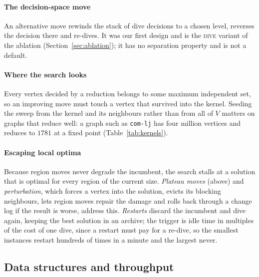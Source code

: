 \documentclass[review,authoryear,11pt]{elsarticle}
\theoremstyle{definition}
\begin{document}
\paragraph{The decision-space move} An alternative move rewinds the stack of dive
decisions to a chosen level, reverses the decision there and re-dives. It was our
first design and is the \textsc{dive} variant of the ablation
(Section~\ref{sec:ablation}); it has no separation property and is not a default.

\paragraph{Where the search looks} Every vertex decided by a reduction belongs
to some maximum independent set, so an improving move must touch a vertex that
survived into the kernel. Seeding the sweep from the kernel and its neighbours
rather than from all of $V$ matters on graphs that reduce well: a graph such as
\texttt{com-lj} has four million vertices and reduces to $1781$ at a fixed point
(Table~\ref{tab:kernels}).

\paragraph{Escaping local optima} Because region moves never degrade the incumbent,
the search stalls at a solution that is optimal for every region of the current
size. \emph{Plateau moves} (above) and \emph{perturbation}, which forces a vertex into
the solution, evicts its blocking neighbours, lets region moves repair the damage and
rolls back through a change log if the result is worse, address this. \emph{Restarts}
discard the incumbent and dive again, keeping the best solution in an archive; the
trigger is idle time in multiples of the cost of one dive, since a restart must pay for
a re-dive, so the smallest instances restart hundreds of times in a minute and the
largest never.

\subsection{Data structures and throughput}
\label{sec:implementation}
\end{document}
